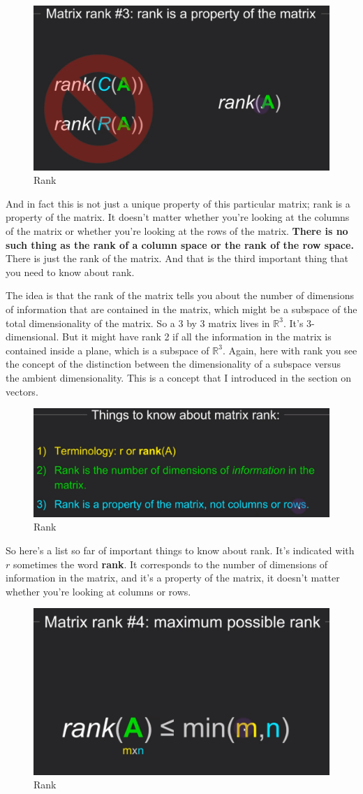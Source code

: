 \documentclass[fleqn,10pt]{olplainarticle}
\theoremstyle{definition}
\theoremstyle{remark}
\begin{document}
\begin{figure}[ht]
	\centering
	\includegraphics[width=0.3\linewidth]{images/rank-04.png}
	\caption{Rank}
	\label{fig:rank_04}
\end{figure}

And in fact this is not just a unique property of this particular matrix; rank is a property of the matrix. It doesn't matter whether you're looking at the columns of the matrix or whether you're looking at the rows of the matrix. \textbf{There is no such thing as the rank of a column space or the rank of the row space.} There is just the rank of the matrix. And that is the third important thing that you need to know about rank.

The idea is that the rank of the matrix tells you about the number of dimensions of information that are contained in the matrix, which might be a subspace of the total dimensionality of the matrix. So a 3 by 3 matrix lives in $\mathbb{R}^3$. It's 3-dimensional. But it might have rank 2 if all the information in the matrix is contained inside a plane, which is a subspace of $\mathbb{R}^3$. Again, here with rank you see the concept of the distinction between the dimensionality of a subspace versus the ambient dimensionality. This is a concept that I introduced in the section on vectors.

\begin{figure}[ht]
	\centering
	\includegraphics[width=0.3\linewidth]{images/rank-05.png}
	\caption{Rank}
	\label{fig:rank_05}
\end{figure}

So here's a list so far of important things to know about rank. It's indicated with $r$ sometimes the word \textbf{rank}. It corresponds to the number of dimensions of information in the matrix, and it's a property of the matrix, it doesn't matter whether you're looking at columns or rows.

\begin{figure}[ht]
	\centering
	\includegraphics[width=0.25\linewidth]{images/rank-06.png}
	\caption{Rank}
	\label{fig:rank_06}
\end{figure}
\end{document}
